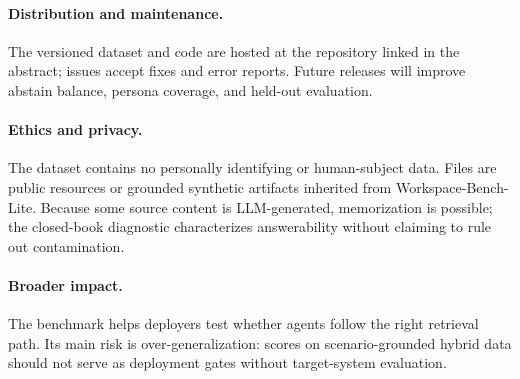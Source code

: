 \documentclass[11pt]{article}
\begin{document}
\paragraph{Distribution and maintenance.}
The versioned dataset and code are hosted at the repository linked in the
abstract; issues accept fixes and error reports. Future releases will improve
abstain balance, persona coverage, and held-out evaluation.

\paragraph{Ethics and privacy.}
The dataset contains no personally identifying or human-subject data. Files
are public resources or grounded synthetic artifacts inherited from
Workspace-Bench-Lite. Because some source content is LLM-generated,
memorization is possible; the closed-book diagnostic characterizes
answerability without claiming to rule out contamination.

\paragraph{Broader impact.}
The benchmark helps deployers test whether agents follow the right retrieval
path. Its main risk is over-generalization: scores on scenario-grounded hybrid
data should not serve as deployment gates without target-system evaluation.
\end{document}
